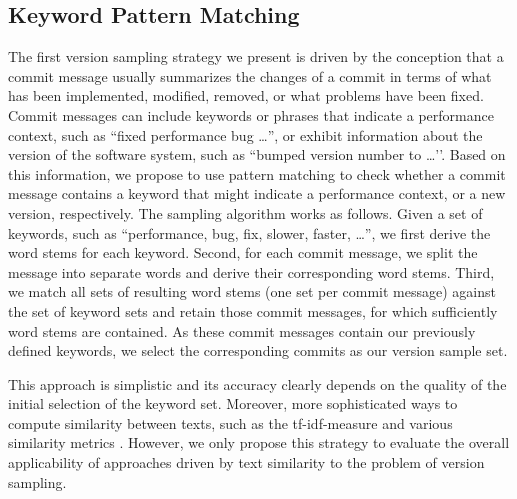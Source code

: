 \subsection{Keyword Pattern Matching}
The first version sampling strategy we present is driven by the conception that
a commit message usually summarizes the changes of a commit in terms of what
has been implemented, modified, removed, or what problems have been fixed.
Commit messages can include keywords or phrases that indicate a performance
context, such as ``\textsf{fixed performance bug \ldots}'', or exhibit
information about the version of the software system, such as ``\textsf{bumped
version number to \ldots'}'.
Based on this information, we propose to use pattern matching to check whether a commit
message contains a keyword that might indicate a performance context, or a new
version, respectively. The sampling algorithm works as follows. Given a set of
keywords, such as ``\textsf{performance, bug, fix, slower, faster, \ldots}'', we
first derive the word stems for each keyword. Second, for each commit message, we split the
message into separate words and derive their corresponding word stems. Third,
we match all sets of resulting word stems (one set per commit message) against
the set of keyword sets and retain those commit messages, for which
sufficiently word stems are contained. As these commit messages contain our
previously defined keywords, we select the corresponding commits as our version
sample set.

This approach is simplistic and its accuracy clearly
depends on the quality of the initial selection of the keyword set. Moreover, more sophisticated ways to
compute similarity between texts, such as the tf-idf-measure and various
similarity metrics \citep{huang_similarity_2008}. However, we only propose this
strategy to evaluate the overall applicability of approaches driven by text
similarity to the problem of version sampling.


